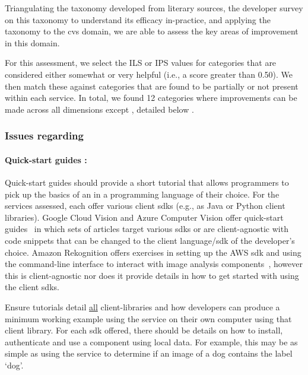 Triangulating the taxonomy developed from literary sources, the developer survey on this taxonomy to understand its efficacy in-practice, and applying the taxonomy to the \gls{cvs} domain, we are able to assess the key areas of improvement in this domain.

For this assessment, we select the ILS or IPS values for categories that are considered either somewhat or very helpful (i.e., a score greater than 0.50). We then match these against categories that are found to be partially or not present within each service. In total, we found 12 categories where improvements can be made across all dimensions except \dime{}, detailed below .

\subsubsection[Dimension A Issues]{Issues regarding \dima{}}

\paragraph{Quick-start guides :} 
Quick-start guides should provide a short tutorial that allows programmers to pick up the basics of an  in a programming language of their choice. For the services assessed, each offer various client \glspl{sdk} (e.g., as Java or Python client libraries). Google Cloud Vision and Azure Computer Vision offer quick-start guides~ in which sets of articles target various \glspl{sdk} or are client-agnostic with code snippets that can be changed to the client language/\gls{sdk} of the developer's choice. Amazon Rekognition offers exercises in setting up the AWS \gls{sdk} and using the command-line interface to interact with image analysis components~, however this is client-agnostic nor does it provide details in how to get started with using the client \glspl{sdk}.


\begin{leftbar}
\SuggestedImprovement
Ensure tutorials detail \uline{all} client-libraries and how developers can produce a minimum working example using the service on their own computer using that client library. For each \gls{sdk} offered, there should be details on how to install, authenticate and use a component using local data. For example, this may be as simple as using the service to determine if an image of a dog contains the label `dog'.
\end{leftbar}

